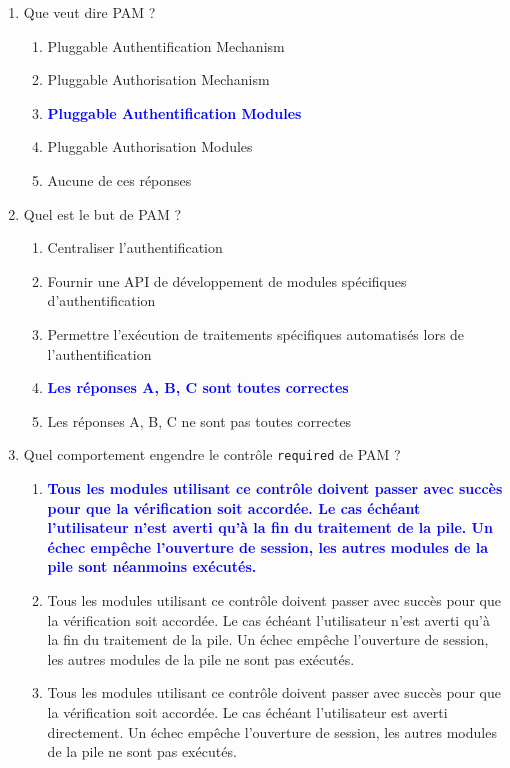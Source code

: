 \documentclass[a4paper]{article}
\begin{document}
\begin{enumerate}
    \item Que veut dire PAM ?
    \begin{enumerate}
        \item Pluggable Authentification Mechanism
        \item Pluggable Authorisation Mechanism
        \item \textcolor{blue}{\textbf{Pluggable Authentification Modules}}
        \item Pluggable Authorisation Modules
        \item Aucune de ces réponses
    \end{enumerate}
    \item Quel est le but de PAM ?
    \begin{enumerate}
        \item Centraliser l'authentification
        \item Fournir une API de développement de modules spécifiques d'authentification
        \item Permettre l'exécution de traitements spécifiques automatisés lors de l'authentification
        \item \textcolor{blue}{\textbf{Les réponses A, B, C sont toutes correctes}}
        \item Les réponses A, B, C ne sont pas toutes correctes
    \end{enumerate}
    \item Quel comportement engendre le contrôle \texttt{required} de PAM ?
    \begin{enumerate}
        \item \textcolor{blue}{\textbf{Tous les modules utilisant ce contrôle doivent passer avec succès pour que la vérification soit accordée. Le cas échéant l'utilisateur n'est averti qu'à la fin du traitement de la pile. Un échec empêche l'ouverture de session, les autres modules de la pile sont néanmoins exécutés.}}
        \item Tous les modules utilisant ce contrôle doivent passer avec succès pour que la vérification soit accordée. Le cas échéant l'utilisateur n'est averti qu'à la fin du traitement de la pile. Un échec empêche l'ouverture de session, les autres modules de la pile ne sont pas exécutés.
        \item Tous les modules utilisant ce contrôle doivent passer avec succès pour que la vérification soit accordée. Le cas échéant l'utilisateur est averti directement. Un échec empêche l'ouverture de session, les autres modules de la pile ne sont pas exécutés.

\end{enumerate}
\end{enumerate}
\end{document}
